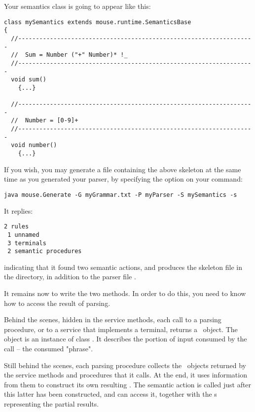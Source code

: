 Your semantics class is going to appear like this:

\small
\begin{Verbatim}[frame=single,framesep=2mm,samepage=true,xleftmargin=15mm,xrightmargin=15mm,baselinestretch=0.8]
class mySemantics extends mouse.runtime.SemanticsBase
{
  //-------------------------------------------------------------------
  //  Sum = Number ("+" Number)* !_
  //-------------------------------------------------------------------
  void sum()
    {...}
  
  //-------------------------------------------------------------------
  //  Number = [0-9]+
  //-------------------------------------------------------------------
  void number()
    {...}
\end{Verbatim}
\normalsize

If you wish, you may generate a file containing the above skeleton at the same time as you generated your parser,
by specifying the option  on your command:

\small
\begin{Verbatim}[samepage=true,xleftmargin=15mm,baselinestretch=0.8]
 java mouse.Generate -G myGrammar.txt -P myParser -S mySemantics -s
\end{Verbatim}
\normalsize

It replies:

\small
\begin{Verbatim}[samepage=true,xleftmargin=15mm,baselinestretch=0.8]
 2 rules
 1 unnamed
 3 terminals
 2 semantic procedures
\end{Verbatim}
\normalsize

indicating that it found two semantic actions,
and produces the skeleton file  in the  directory,
in addition to the parser file .

It remains now to write the two methods.
In order to do this, you need to know how to access the result of parsing. 

Behind the scenes, hidden in the service methods,
each call to a parsing procedure,
or to a service that implements a terminal,
returns a \Phrase\ object. 
The object is an instance of class \Phrase.
It describes the portion of input consumed
by the call -- the consumed "phrase".

Still behind the scenes, each parsing procedure collects 
the \Phrase\ objects returned
by the service methods and procedures that it calls.
At the end, it uses information from them
to construct its own resulting \Phrase.
The semantic action is called just after this latter
has been constructed, and can access it, together
with the \Phrase s representing the partial results.

